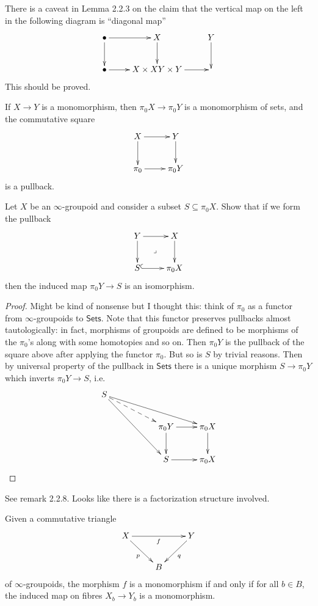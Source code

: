 \begin{remark}
\label{remark-lemma-2.2.3}
There is a caveat in Lemma 2.2.3 on the claim
that the vertical map on the left in the following
diagram is ``diagonal map''
$$
\xymatrix{
\bullet\ar[r]\ar[d]&X\ar[d]&Y\ar[d]\\
\bullet\ar[r]&X \times X\ar[r]Y \times Y&
}
$$
This should be proved.
\end{remark}

\begin{proposition}
\label{proposition-monomorphism-then-monomorophism-of-sets-and-pullback-square}
If $X \to Y$ is a monomorphism, then $\pi_0X \to \pi_0Y$ 
is a monomorphism of sets, and the commutative square
$$
\xymatrix{
X\ar[r]\ar[d]&Y\ar[d]\\
\pi_0\ar[r]&\pi_0Y
}
$$
is a pullback.
\end{proposition}

\begin{exercise}
\label{exercise-2.7}
Let $X$ be an $\infty$-groupoid and consider a subset $S\subseteq \pi_0X$.
Show that if we form the pullback
$$
\xymatrix{
Y\ar[r]\ar[d]\ar@{}[dr]|-{\lrcorner}&X\ar[d]\\
S\ar@{^{(}->}[r]&\pi_0X
}
$$
then the induced map $\pi_0Y\to S$ is an isomorphism.
\end{exercise}

\begin{proof}
Might be kind of nonsense but I thought this:
think of $\pi_0$ as a functor from  $\infty$-groupoids
to $\mathsf{Sets}$. Note that this functor
preserves pullbacks almost tautologically:
in fact, morphisms of groupoids are defined
to be morphisms of the $\pi_0$'s along
with some homotopies and so on. Then
$\pi_0Y$ is the pullback of the square above
after applying the functor $\pi_0$.
But so is $S$ by trivial reasons.
Then by universal property of the pullback
in $\mathsf{Sets}$ there is a unique morphism
$S \to \pi_0Y$ which inverts $\pi_0Y \to S$,
i.e.
$$
\xymatrix{
S \ar[rrrd] \ar@{-->}[rrd] \ar[rrdd] & & \\
& & \pi_0Y \ar[d] \ar[r] & \pi_0X \ar[d] \\
& & S \ar[r] & \pi_0X
}
$$
\end{proof}

\noindent
See remark 2.2.8. Looks like there
is a factorization structure involved.

\begin{exercise}[2.8]
\label{exercise-2.8}
Given a commutative triangle
$$
\xymatrix{
X \ar[rd]_{p} \ar[rr]_{f} && Y \ar[dl]^{q} \\
& B
}
$$
of $\infty$-groupoids, the morphism $f$ is a monomorphism
if and only if for all $b \in B$, the
induced map on fibres $X_b \to Y_b$ is a monomorphism.
\end{exercise}

